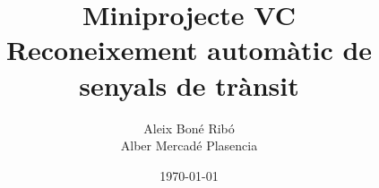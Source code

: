 



\usepackage{pdfpages}

\title{Miniprojecte VC\\ \Large \normalfont Reconeixement automàtic de senyals
de trànsit}
\author{Aleix Bon\'e Rib\'o\\ Alber Mercad\'e Plasencia}
\date{\today}




    



    \tableofcontents \pagebreak



    \setlength{\parskip}{1em plus 0.5em minus 0.2em}

    



    \appendix

    


